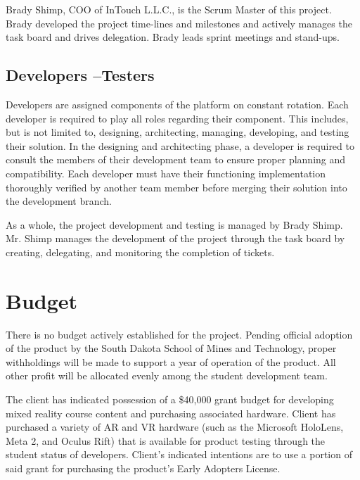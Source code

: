 Brady Shimp, COO of InTouch L.L.C., is the Scrum Master of this project. Brady developed the project time-lines and milestones and actively manages the task board and drives delegation. Brady leads sprint meetings and stand-ups. 

\subsection{Developers --Testers}

Developers are assigned components of the platform on constant rotation. Each developer is required to play all roles regarding their component. This includes, but is not limited to, designing, architecting, managing, developing, and testing their solution. In the designing and architecting phase, a developer is required to consult the members of their development team to ensure proper planning and compatibility. Each developer must have their functioning implementation thoroughly verified by another team member before merging their solution into the development branch. 

As a whole, the project development and testing is managed by Brady Shimp. Mr. Shimp manages the development of the project through the task board by creating, delegating, and monitoring the completion of tickets. 

\section{Budget}

There is no budget actively established for the project. Pending official adoption of the product by the South Dakota School of Mines and Technology, proper withholdings will be made to support a year of operation of the product. All other profit will be allocated evenly among the student development team. 

The client has indicated possession of a \$40,000 grant budget for developing mixed reality course content and purchasing associated hardware. Client has purchased a variety of AR and VR hardware (such as the Microsoft HoloLens, Meta 2, and Oculus Rift) that is available for product testing through the student status of developers. Client's indicated intentions are to use a portion of said grant for purchasing the product's Early Adopters License. 


